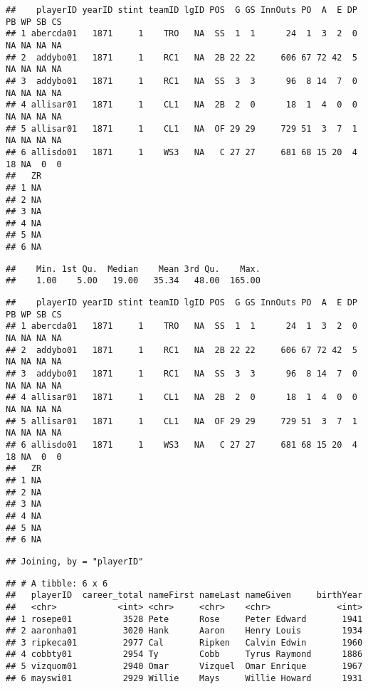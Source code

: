 \documentclass[
  12pt,
]{article}
\begin{document}
\begin{verbatim}
##    playerID yearID stint teamID lgID POS  G GS InnOuts PO  A  E DP PB WP SB CS
## 1 abercda01   1871     1    TRO   NA  SS  1  1      24  1  3  2  0 NA NA NA NA
## 2  addybo01   1871     1    RC1   NA  2B 22 22     606 67 72 42  5 NA NA NA NA
## 3  addybo01   1871     1    RC1   NA  SS  3  3      96  8 14  7  0 NA NA NA NA
## 4 allisar01   1871     1    CL1   NA  2B  2  0      18  1  4  0  0 NA NA NA NA
## 5 allisar01   1871     1    CL1   NA  OF 29 29     729 51  3  7  1 NA NA NA NA
## 6 allisdo01   1871     1    WS3   NA   C 27 27     681 68 15 20  4 18 NA  0  0
##   ZR
## 1 NA
## 2 NA
## 3 NA
## 4 NA
## 5 NA
## 6 NA
\end{verbatim}

\begin{verbatim}
##    Min. 1st Qu.  Median    Mean 3rd Qu.    Max. 
##    1.00    5.00   19.00   35.34   48.00  165.00
\end{verbatim}

\begin{verbatim}
##    playerID yearID stint teamID lgID POS  G GS InnOuts PO  A  E DP PB WP SB CS
## 1 abercda01   1871     1    TRO   NA  SS  1  1      24  1  3  2  0 NA NA NA NA
## 2  addybo01   1871     1    RC1   NA  2B 22 22     606 67 72 42  5 NA NA NA NA
## 3  addybo01   1871     1    RC1   NA  SS  3  3      96  8 14  7  0 NA NA NA NA
## 4 allisar01   1871     1    CL1   NA  2B  2  0      18  1  4  0  0 NA NA NA NA
## 5 allisar01   1871     1    CL1   NA  OF 29 29     729 51  3  7  1 NA NA NA NA
## 6 allisdo01   1871     1    WS3   NA   C 27 27     681 68 15 20  4 18 NA  0  0
##   ZR
## 1 NA
## 2 NA
## 3 NA
## 4 NA
## 5 NA
## 6 NA
\end{verbatim}

\begin{verbatim}
## Joining, by = "playerID"
\end{verbatim}

\begin{verbatim}
## # A tibble: 6 x 6
##   playerID  career_total nameFirst nameLast nameGiven     birthYear
##   <chr>            <int> <chr>     <chr>    <chr>             <int>
## 1 rosepe01          3528 Pete      Rose     Peter Edward       1941
## 2 aaronha01         3020 Hank      Aaron    Henry Louis        1934
## 3 ripkeca01         2977 Cal       Ripken   Calvin Edwin       1960
## 4 cobbty01          2954 Ty        Cobb     Tyrus Raymond      1886
## 5 vizquom01         2940 Omar      Vizquel  Omar Enrique       1967
## 6 mayswi01          2929 Willie    Mays     Willie Howard      1931
\end{verbatim}
\end{document}
